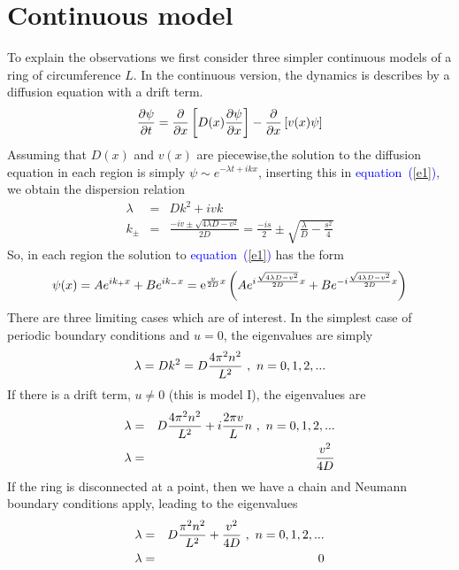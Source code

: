 \documentclass[aps,pre,floats,floatfix,fleqn,notitlepage]{revtex4-1}
\newcommand{\eexp}{\mbox{e}^}
\newcommand{\mylabel}[1]{\label{#1}}  %
\newcommand{\beq}{\begin{eqnarray}}
\newcommand{\eeq}{\end{eqnarray}}
\newcommand{\be}[1]{\begin{eqnarray}\ifthenelse{#1=-1}{\nonumber}{\ifthenelse{#1=0}{}{\mylabel{e#1}}}}
\newcommand{\ee}{\end{eqnarray}}
\newcommand{\Eq}[1]{\textcolor{blue}{equation~(\ref{#1})}} %
\begin{document}
\section{Continuous model}
To explain the observations we first consider three simpler continuous models of a ring of circumference $L$.
In the continuous version, the dynamics is describes by a diffusion equation with a drift term. 
%
\be{1}
\frac{\partial \psi}{\partial t} = \frac{\partial}{\partial x} \left[ D(x) \frac{\partial \psi}{\partial x}\right] -
 \frac{\partial}{\partial x} \left[v(x)\psi\right]
\ee
%
Assuming that $D(x)$ and $v(x)$ are piecewise,the 
solution to the diffusion equation in each region is  simply  $\psi \sim e^{-\lambda t + ikx}$, inserting this in \Eq{e1}, we obtain the dispersion relation 
%
\beq
\lambda &=& Dk^2 + ivk\\
k_{\pm} &=& \frac{-iv \pm \sqrt{4\lambda D -v^2}}{2D} = \frac{-is}{2} \pm \sqrt{\frac{\lambda}{D}-\frac{s^2}{4}}
\eeq
%
So, in each region the solution to \Eq{e1} has the form 
\be{2}
\psi(x) = Ae^{ik_{+} x}+ Be^{ik_{-} x} = \eexp{\frac{v}{2D}x} \left(Ae^{i\frac{\sqrt{4\lambda D -v^2}}{2D}x}+Be^{-i\frac{\sqrt{4\lambda D -v^2}}{2D}x}\right)
\ee
%
There are three limiting cases which are of interest.
In the simplest case of periodic boundary conditions and $u=0$, the eigenvalues are simply
%
\be{3}
\lambda  = Dk^2 =D\frac{4\pi^2 n^2}{L^2} \ , \ n=0,1,2,...
\ee
%
If there is a drift term, $u\neq 0$ (this is model I), the eigenvalues are 
\be{4}
\lambda &=&  D\frac{4\pi^2 n^2}{L^2}+i\frac{2\pi v}{L} n \ , \ n=0,1,2,...\\
\lambda &=&  \frac{v^2}{4D}
\ee
%
If the ring is disconnected at a point, then we have a chain and Neumann boundary conditions apply, 
leading to the eigenvalues 
%
\be{5}
\lambda &=& D\frac{\pi^2 n^2}{L^2} + \frac{v^2}{4D} \ , \ n=0,1,2,...\\ 
\lambda &=& 0
\ee
%
\end{document}
